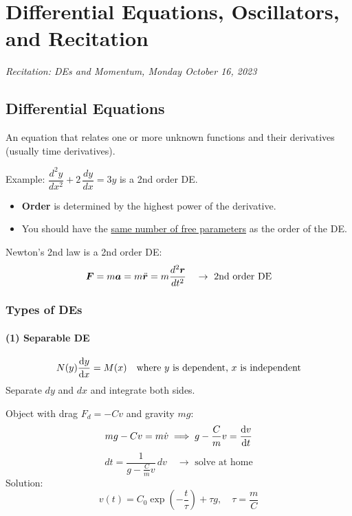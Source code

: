 \chapter{Differential Equations, Oscillators, and Recitation}

\textit{Recitation: DEs and Momentum, Monday October 16, 2023}

\section{Differential Equations}

\begin{definition}
An equation that relates one or more unknown functions and their derivatives (usually time derivatives).
\end{definition}

Example: $\dfrac{d^2y}{dx^2} + 2\,\dfrac{dy}{dx} = 3y$ is a 2nd order DE.

\begin{itemize}
    \item \textbf{Order} is determined by the highest power of the derivative.
    \item You should have the \underline{same number of free parameters} as the order of the DE.
\end{itemize}

Newton's 2nd law is a 2nd order DE:
\[
    \vect{F} = m\lvect{a} = m\ddot{\lvect{r}} = m\frac{d^2\lvect{r}}{dt^2} \quad \to \text{ 2nd order DE}
\]

\subsection{Types of DEs}

\subsubsection{(1) Separable DE}

\[
    N(y)\dv{y}{x} = M(x) \quad \text{where } y \text{ is dependent, } x \text{ is independent}
\]
Separate $dy$ and $dx$ and integrate both sides.

\begin{example}
Object with drag $F_d = -Cv$ and gravity $mg$:
\[
    mg - Cv = m\dot{v} \implies g - \frac{C}{m}v = \dv{v}{t}
\]
\[
    dt = \frac{1}{g - \frac{C}{m}v}\,dv \quad \to \text{ solve at home}
\]
Solution:
\[
    v(t) = C_0\exp\!\left(-\frac{t}{\tau}\right) + \tau g, \quad \tau = \frac{m}{C}
\]
\end{example}


